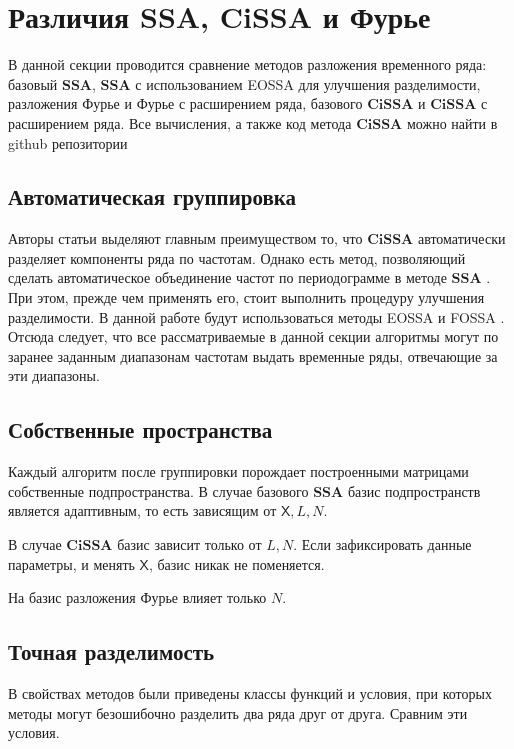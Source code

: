 \documentclass[a4paper, 11pt]{article}
\newcommand{\SSA}{\textbf{SSA}}
\newcommand{\CISSA}{\textbf{CiSSA}}
\newcommand{\TS}{\mathsf{X}}
\begin{document}
\section{Различия SSA, CiSSA и Фурье}
В данной секции проводится сравнение методов разложения временного ряда: базовый $\SSA$,  $\SSA$ с использованием EOSSA для улучшения разделимости, разложения Фурье и Фурье с расширением ряда, базового $\CISSA$ и $\CISSA$ с расширением ряда. Все вычисления, а также код метода $\CISSA$ можно найти в github репозитории \cite{spbu_cissa_coursework_github}


\subsection{Автоматическая группировка}

\label{subsubsec:autogroup}

Авторы статьи \cite{bogalo2020} выделяют главным преимуществом то, что $\CISSA$ автоматически разделяет компоненты ряда по частотам. Однако есть метод, позволяющий сделать автоматическое объединение частот по периодограмме в методе $\SSA$ 
\cite{golyandina2023automatedidentificationsingularspectrum}
. При этом, прежде чем применять его, стоит выполнить процедуру улучшения разделимости. В данной работе будут использоваться методы EOSSA и FOSSA \cite{golyandina2023intelligent}. Отсюда следует, что все рассматриваемые в данной секции алгоритмы могут по заранее заданным диапазонам частотам выдать временные ряды, отвечающие за эти диапазоны.



\subsection{Собственные пространства}
Каждый алгоритм после группировки порождает построенными матрицами собственные подпространства. В случае базового $\SSA$ базис подпространств является адаптивным, то есть зависящим от $\TS, L, N$.

В случае $\CISSA$ базис зависит только от $L, N$. Если зафиксировать данные параметры, и менять $\TS$, базис никак не поменяется. 

На базис разложения Фурье влияет только $N$.


\subsection{Точная разделимость}
\label{subsubsec:exact}

В свойствах методов были приведены классы функций и условия, при которых методы могут безошибочно разделить два ряда друг от друга. Сравним эти условия.
\end{document}
